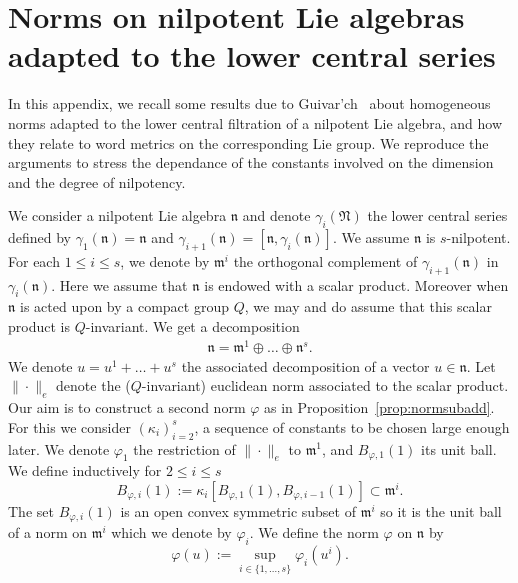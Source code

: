 \documentclass[11pt,leqno]{article}
\theoremstyle{plain}
\theoremstyle{definition}
\theoremstyle{remark}
\numberwithin{equation}{section}
\begin{document}
\appendix

\section{Norms on nilpotent Lie algebras adapted to the lower central series }\label{app:norms}

In this appendix, we recall some results due to Guivar'ch~\cite{Guivarch} about homogeneous norms adapted to the lower central filtration of a nilpotent Lie algebra, and how they relate to word metrics on the corresponding Lie group. We reproduce the arguments to stress the dependance of the constants involved on the dimension and the degree of nilpotency.

We consider a nilpotent Lie algebra $\mathfrak{n}$ and denote $\gamma_i(\mathfrak{N})$ the lower central series defined by $\gamma_1(\mathfrak{n})=\mathfrak{n}$ and $\gamma_{i+1}(\mathfrak{n})=[\mathfrak{n},\gamma_i(\mathfrak{n})]$. We assume $\mathfrak{n}$ is $s$-nilpotent. For each $1 \le i \le s$, we denote by $\mathfrak{m}^i$ the orthogonal complement of $\gamma_{i+1}(\mathfrak{n})$ in $\gamma_i(\mathfrak{n})$. Here we assume that $\mathfrak{n}$ is endowed with a scalar product. Moreover when $\mathfrak{n}$ is acted upon by a compact group $Q$, we may and do assume that this scalar product is $Q$-invariant. We get a decomposition
\begin{align}\label{eq:decomp2}
\mathfrak{n}=\mathfrak{m}^1 \oplus \dots \oplus \mathfrak{n}^s.
\end{align}
We denote $u=u^1+\dots+u^s$ the associated decomposition of a vector $u \in \mathfrak{n}$.
Let $\|\cdot\|_e$ denote the ($Q$-invariant) euclidean norm associated to the scalar product. %
Our aim is to construct a second norm $\varphi$ as in Proposition~\ref{prop:normsubadd}. For this we consider $(\kappa_i)_{i=2}^s$, a sequence of constants to be chosen large enough later. We denote $\varphi_1$ the restriction of $\|\cdot\|_e$ to $\mathfrak{m}^1$, and $B_{\varphi,1}(1)$ its unit ball. We define inductively for $2\le i \le s$
\[
B_{\varphi,i}(1):=\kappa_i[B_{\varphi,1}(1),B_{\varphi,i-1}(1)] \subset \mathfrak{m}^i.
\]
The set $B_{\varphi,i}(1)$ is an open convex symmetric subset of $\mathfrak{m}^i$ so  it is the unit ball of a norm on $\mathfrak{m}^i$ which we denote by $\varphi_i$. We define the norm $\varphi$ on $\mathfrak{n}$ by
\begin{equation}\label{eq:phinorm}
\varphi(u):=\sup_{i \in \{1,\dots,s\}}\varphi_i\left( u^i\right).
\end{equation}
\end{document}
